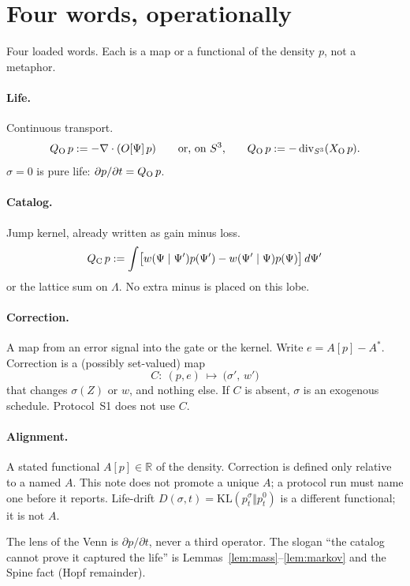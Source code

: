 \section{Four words, operationally}
\label{sec:words}

Four loaded words. Each is a map or a functional of the density \(p\),
not a metaphor.

\paragraph{Life.}
Continuous transport.
\[
Q_{\mathrm{O}}\,p
:= -\nabla\cdot(O[\Psi]\,p)
\qquad\text{or, on \(S^{3}\),}\qquad
Q_{\mathrm{O}}\,p
:= -\operatorname{div}_{S^{3}}(X_{\mathrm{O}}\,p).
\]
\(\sigma=0\) is pure life: \(\partial p/\partial t = Q_{\mathrm{O}}\,p\).

\paragraph{Catalog.}
Jump kernel, already written as gain minus loss.
\[
Q_{\mathrm{C}}\,p
:= \int\bigl[w(\Psi\mid\Psi')p(\Psi')
      -w(\Psi'\mid\Psi)p(\Psi)\bigr]\,d\Psi'
\]
or the lattice sum on \(\Lambda\).
No extra minus is placed on this lobe.

\paragraph{Correction.}
A map from an error signal into the gate or the kernel.
Write \(e = A[p]-A^{\ast}\).
Correction is a (possibly set-valued) map
\[
C:\ (p,e)\ \mapsto\ \bigl(\sigma',\,w'\bigr)
\]
that changes \(\sigma(Z)\) or \(w\), and nothing else.
If \(C\) is absent, \(\sigma\) is an exogenous schedule.
Protocol~S1 does not use \(C\).

\paragraph{Alignment.}
A stated functional \(A[p]\in\mathbb{R}\) of the density.
Correction is defined only relative to a named \(A\).
This note does not promote a unique \(A\);
a protocol run must name one before it reports.
Life-drift \(D(\sigma,t)=\mathrm{KL}(p_{t}^{\sigma}\Vert p_{t}^{0})\)
is a different functional; it is not \(A\).

The lens of the Venn is \(\partial p/\partial t\), never a third operator.
The slogan ``the catalog cannot prove it captured the life''
is Lemmas~\ref{lem:mass}--\ref{lem:markov} and the Spine fact (Hopf remainder).
